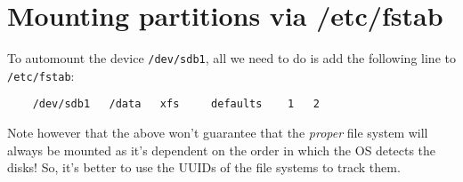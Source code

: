 
\usepackage{minted}
\usepackage{booktabs}


	
	
	\section{Mounting partitions via /etc/fstab}
	To automount the device \verb|/dev/sdb1|, all we need to do is add the following line to \verb|/etc/fstab|:
	
	\vspace{-15pt}
	\begin{verbatim}
	/dev/sdb1	/data	xfs		defaults	1	2
	\end{verbatim}
	\vspace{-10pt}
	
	Note however that the above won't guarantee that the \textit{proper} file system will always be mounted as it's dependent on the order in which the OS detects the disks! So, it's better to use the UUIDs of the file systems to track them. 
	

